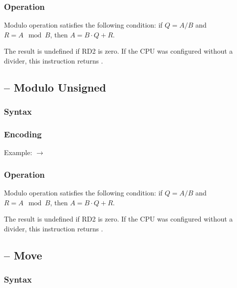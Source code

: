 \documentclass[a4paper,12pt,twoside,extrafontsizes]{memoir}
\begin{document}
{\subsubsection{Operation}


Modulo operation satisfies the following condition: if $Q=A/B$ and $R=A \mod B$, then $A=B \cdot Q+R$.

The result is undefined if RD2 is zero. If the CPU was configured without a divider, this instruction returns .

\subsection{ -- Modulo Unsigned}
\label{subsec:instr:modu}

\subsubsection{Syntax}


\subsubsection{Encoding}


Example:  $\rightarrow$ 

\subsubsection{Operation}


Modulo operation satisfies the following condition: if $Q=A/B$ and $R=A \mod B$, then $A=B \cdot Q+R$.

The result is undefined if RD2 is zero. If the CPU was configured without a divider, this instruction returns .

\subsection{ -- Move}
\label{subsec:instr:mov}

\subsubsection{Syntax}

}
\end{document}
